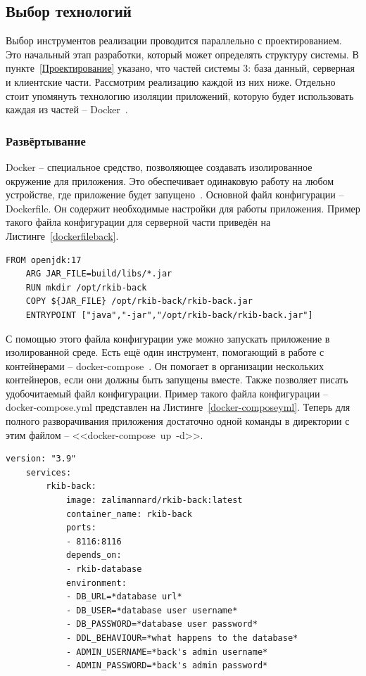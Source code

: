 \documentclass[a4paper,article]{article}
\begin{document}
\begin{sloppypar}
    \subsection{Выбор технологий}\label{Реализация. Выбор}

    Выбор инструментов реализации проводится параллельно с проектированием. Это начальный этап разработки, который может определять структуру системы. В пункте~\ref{Проектирование} указано, что частей системы 3: база данный, серверная и клиентские части. Рассмотрим реализацию каждой из них ниже. Отдельно стоит упомянуть технологию изоляции приложений, которую будет использовать каждая из частей -- Docker~\cite{dockerdoc}.

    \subsubsection{Развёртывание}\label{Реализация. Выбор. Докер}

    Docker -- специальное средство, позволяющее создавать изолированное окружение для приложения. Это обеспечивает одинаковую работу на любом устройстве, где приложение будет запущено~\cite{dockerdoc}. Основной файл конфигурации -- Dockerfile. Он содержит необходимые настройки для работы приложения. Пример такого файла конфигурации для серверной части приведён на Листинге~\ref{dockerfileback}.

    \begin{lstlisting}[label=dockerfileback,caption=Пример Dockerfile для бекенда]
    FROM openjdk:17
    ARG JAR_FILE=build/libs/*.jar
    RUN mkdir /opt/rkib-back
    COPY ${JAR_FILE} /opt/rkib-back/rkib-back.jar
    ENTRYPOINT ["java","-jar","/opt/rkib-back/rkib-back.jar"]
    \end{lstlisting}

    С помощью этого файла конфигурации уже можно запускать приложение в изолированной среде. Есть ещё один инструмент, помогающий в работе с контейнерами -- docker-compose~\cite{dockerdoc}. Он помогает в организации нескольких контейнеров, если они должны быть запущены вместе. Также позволяет писать удобочитаемый файл конфигурации. Пример такого файла конфигурации -- docker-compose.yml представлен на Листинге~\ref{docker-composeyml}. Теперь для полного разворачивания приложения достаточно одной команды в директории с этим файлом -- <<docker-compose~up~-d>>.

    \begin{lstlisting}[label=docker-composeyml,caption=Пример файла конфигурации docker-compose.yml]
    version: "3.9"
    services:
        rkib-back:
            image: zalimannard/rkib-back:latest
            container_name: rkib-back
            ports:
            - 8116:8116
            depends_on:
            - rkib-database
            environment:
            - DB_URL=*database url*
            - DB_USER=*database user username*
            - DB_PASSWORD=*database user password*
            - DDL_BEHAVIOUR=*what happens to the database*
            - ADMIN_USERNAME=*back's admin username*
            - ADMIN_PASSWORD=*back's admin password*
    \end{lstlisting}


\end{sloppypar}
\end{document}
